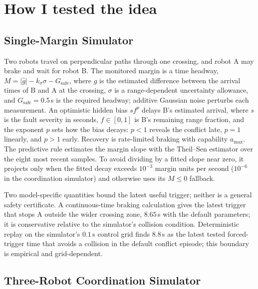 \section{How I tested the idea}
\label{sec:method}

\subsection{Single-Margin Simulator}

Two robots travel on perpendicular paths through one crossing, and robot A may
brake and wait for robot B.  The monitored margin is a time headway,
$M=\lvert\hat g\rvert-k_\sigma\sigma-G_{\mathrm{safe}}$, where $\hat g$ is the
estimated difference between the arrival times of B and A at the crossing,
$\sigma$ is a range-dependent uncertainty allowance, and
$G_{\mathrm{safe}}=0.5$\,s is the required headway; additive Gaussian noise
perturbs each measurement.  An optimistic hidden bias $s f^{p}$ delays B's
estimated arrival, where $s$ is the fault severity in seconds, $f\in[0,1]$ is
B's remaining range fraction, and the exponent $p$ sets how the bias decays:
$p<1$ reveals the conflict late, $p=1$ linearly, and $p>1$ early.  Recovery is
rate-limited braking with capability $a_{\max}$.  The predictive rule estimates
the margin slope with the Theil--Sen estimator \cite{sen1968theilsen} over the
eight most recent samples.  To avoid dividing by a fitted slope near zero, it
projects only when the fitted decay exceeds $10^{-3}$ margin units per second
($10^{-6}$ in the coordination simulator) and otherwise uses its $M\le0$
fallback.

Two model-specific quantities bound the latest useful trigger; neither is a
general safety certificate.  A continuous-time braking calculation gives the
latest trigger that stops A outside the wider crossing zone, $8.65$\,s with the
default parameters; it is conservative relative to the simulator's collision
condition.  Deterministic replay on the simulator's $0.1$\,s control grid finds
$8.8$\,s as the latest tested forced-trigger time that avoids a collision in the
default conflict episode; this boundary is empirical and grid-dependent.

\subsection{Three-Robot Coordination Simulator}

